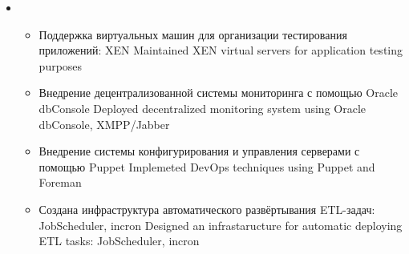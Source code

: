 \documentclass[11pt,a4paper,sans, russian]{moderncv}        %
\begin{document}
{\begin{itemize}
\begin{itemize}
				{Мониторинг СУБД с помощью Oracle dbConsole и Oracle Enterprise Manager}
				{Installed and maintained database monitoring system: Oracle dbConsole and Oracle Enterprise Manager}
			\item {}
				{Оптимизация SQL-запросов}
				{Optimized SQL-query}
			\item {}
				{Анализ производительности и настройка Linux-серверов для СУБД Oracle}
				{Analyzed and tuned Linux servers perfomance for Oracle RDBMS}
		\end{itemize}
	\item {}
		\begin{itemize}
			\item {}
				{Поддержка виртуальных машин для организации тестирования приложений: XEN}
				{Maintained XEN virtual servers for application testing purposes}
			\item {}
				{Внедрение децентрализованной системы мониторинга с помощью Oracle dbConsole}
				{Deployed decentralized monitoring system using Oracle dbConsole, XMPP/Jabber}
			\item {}
				{Внедрение системы конфигурирования и управления серверами с помощью Puppet}
				{Implemeted DevOps techniques using Puppet and Foreman}
			\item {}
				{Создана инфраструктура автоматического развёртывания ETL-задач: JobScheduler, incron}
				{Designed an infrastaructure for automatic deploying ETL tasks: JobScheduler, incron}
		\end{itemize}
	\end{itemize}
}
\end{document}
